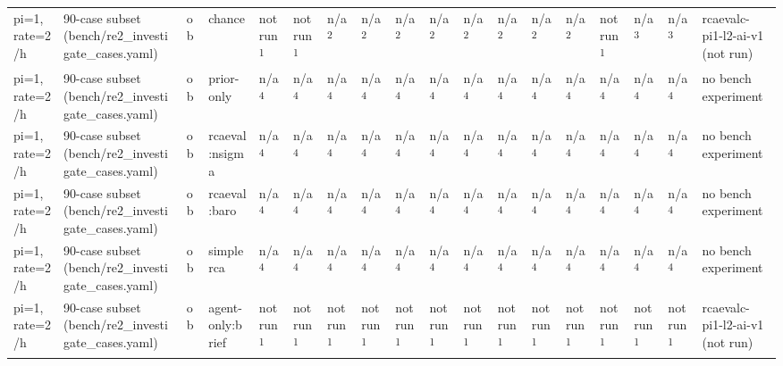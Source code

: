 \begin{table}[t]
\begin{tabular}{llllllllllllllllll}
pi=1, rate=2/h & 90-case subset (bench/re2\_investigate\_cases.yaml) & ob & chance & not run\textsuperscript{1} & not run\textsuperscript{1} & n/a\textsuperscript{2} & n/a\textsuperscript{2} & n/a\textsuperscript{2} & n/a\textsuperscript{2} & n/a\textsuperscript{2} & n/a\textsuperscript{2} & n/a\textsuperscript{2} & n/a\textsuperscript{2} & not run\textsuperscript{1} & n/a\textsuperscript{3} & n/a\textsuperscript{3} & rcaevalc-pi1-l2-ai-v1 (not run) \\
pi=1, rate=2/h & 90-case subset (bench/re2\_investigate\_cases.yaml) & ob & prior-only & n/a\textsuperscript{4} & n/a\textsuperscript{4} & n/a\textsuperscript{4} & n/a\textsuperscript{4} & n/a\textsuperscript{4} & n/a\textsuperscript{4} & n/a\textsuperscript{4} & n/a\textsuperscript{4} & n/a\textsuperscript{4} & n/a\textsuperscript{4} & n/a\textsuperscript{4} & n/a\textsuperscript{4} & n/a\textsuperscript{4} & no bench experiment \\
pi=1, rate=2/h & 90-case subset (bench/re2\_investigate\_cases.yaml) & ob & rcaeval:nsigma & n/a\textsuperscript{4} & n/a\textsuperscript{4} & n/a\textsuperscript{4} & n/a\textsuperscript{4} & n/a\textsuperscript{4} & n/a\textsuperscript{4} & n/a\textsuperscript{4} & n/a\textsuperscript{4} & n/a\textsuperscript{4} & n/a\textsuperscript{4} & n/a\textsuperscript{4} & n/a\textsuperscript{4} & n/a\textsuperscript{4} & no bench experiment \\
pi=1, rate=2/h & 90-case subset (bench/re2\_investigate\_cases.yaml) & ob & rcaeval:baro & n/a\textsuperscript{4} & n/a\textsuperscript{4} & n/a\textsuperscript{4} & n/a\textsuperscript{4} & n/a\textsuperscript{4} & n/a\textsuperscript{4} & n/a\textsuperscript{4} & n/a\textsuperscript{4} & n/a\textsuperscript{4} & n/a\textsuperscript{4} & n/a\textsuperscript{4} & n/a\textsuperscript{4} & n/a\textsuperscript{4} & no bench experiment \\
pi=1, rate=2/h & 90-case subset (bench/re2\_investigate\_cases.yaml) & ob & simplerca & n/a\textsuperscript{4} & n/a\textsuperscript{4} & n/a\textsuperscript{4} & n/a\textsuperscript{4} & n/a\textsuperscript{4} & n/a\textsuperscript{4} & n/a\textsuperscript{4} & n/a\textsuperscript{4} & n/a\textsuperscript{4} & n/a\textsuperscript{4} & n/a\textsuperscript{4} & n/a\textsuperscript{4} & n/a\textsuperscript{4} & no bench experiment \\
pi=1, rate=2/h & 90-case subset (bench/re2\_investigate\_cases.yaml) & ob & agent-only:brief & not run\textsuperscript{1} & not run\textsuperscript{1} & not run\textsuperscript{1} & not run\textsuperscript{1} & not run\textsuperscript{1} & not run\textsuperscript{1} & not run\textsuperscript{1} & not run\textsuperscript{1} & not run\textsuperscript{1} & not run\textsuperscript{1} & not run\textsuperscript{1} & not run\textsuperscript{1} & not run\textsuperscript{1} & rcaevalc-pi1-l2-ai-v1 (not run) \\

\end{tabular}
\end{table}

